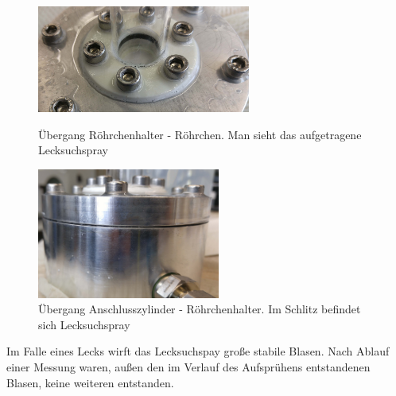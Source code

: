 \begin{figure}[h!]
		\begin{minipage}[hbt]{7cm}
			\centering
			\includegraphics[width=7cm]{Leck1_vorher.jpg}
			\caption[Leck Röhrchenansatz vorher]{Übergang Röhrchenhalter - Röhrchen. Man sieht das aufgetragene Lecksuchspray}
		\end{minipage}
		\hfill
		\begin{minipage}[hbt]{6cm}
			\centering
			\includegraphics[width=6cm]{Leck2_vorher.jpg}
			\caption[Leck Anschlusszylinder vorher]{Übergang Anschlusszylinder - Röhrchenhalter. Im Schlitz befindet sich Lecksuchspray}
		\end{minipage}
\end{figure}

Im Falle eines Lecks wirft das Lecksuchspay große stabile Blasen. Nach Ablauf einer Messung waren, außen den im Verlauf des Aufsprühens entstandenen Blasen, keine weiteren entstanden.


